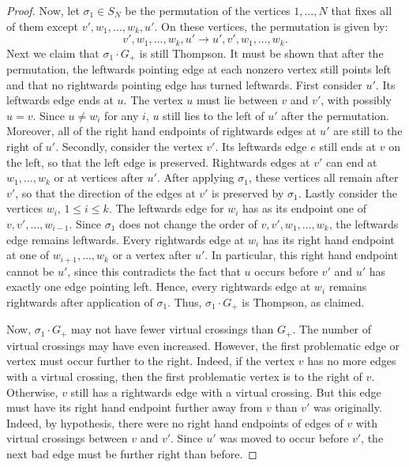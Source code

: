 \documentclass[11pt, twoside]{amsart}
\numberwithin{equation}{section}
\theoremstyle{definition}
\numberwithin{equation}{section}
\begin{document}
\begin{proof}
Now, let $\sigma_1 \in S_N$ be the permutation of the vertices $1,\ldots,N$ that fixes all of them except $v',w_1,\ldots, w_k,u'$. On these vertices, the permutation is given by:
\[
v',w_1,\ldots, w_k,u' \to u',v',w_1,\ldots, w_k.
\]
Next we claim that $\sigma_1\cdot G_+$ is still Thompson. It must be shown that after the permutation, the leftwards pointing edge at each nonzero vertex still points left and that no rightwards pointing edge has turned leftwards. First consider $u'$. Its leftwards edge ends at $u$. The vertex $u$ must lie between $v$ and $v'$, with possibly $u=v$. Since $u \ne w_i$ for any $i$, $u$ still lies to the left of $u'$ after the permutation. Moreover, all of the right hand endpoints of rightwards edges at $u'$ are still to the right of $u'$. Secondly, consider the vertex $v'$.  Its leftwards edge $e$ still ends at $v$ on the left, so that the left edge is preserved. Rightwards edges at $v'$ can end at $w_1,\ldots,w_k$ or at vertices after $u'$. After applying $\sigma_1$, these vertices all remain after $v'$, so that the direction of the edges at $v'$ is preserved by $\sigma_1$. Lastly consider the vertices $w_i$, $1 \le i \le k$. The leftwards edge for $w_i$ has as its endpoint one of $v,v',\ldots, w_{i-1}$. Since $\sigma_1$ does not change the order of $v,v',w_1,\ldots,w_k$, the leftwards edge remains leftwards. Every rightwards edge at $w_i$ has its right hand endpoint at one of $w_{i+1},\ldots, w_k$ or a vertex after $u'$. In particular, this right hand endpoint cannot be $u'$, since this contradicts the fact that $u$ occurs before $v'$ and $u'$ has exactly one edge pointing left. Hence, every rightwards edge at $w_i$ remains rightwards after application of $\sigma_1$. Thus, $\sigma_1 \cdot G_+$ is Thompson, as claimed.  

Now, $\sigma_1 \cdot G_+$ may not have fewer virtual crossings than $G_+$. The number of virtual crossings may have even increased. However, the first problematic edge or vertex must occur further to the right. Indeed, if the vertex $v$ has no more edges with a virtual crossing, then the first problematic vertex is to the right of $v$. Otherwise, $v$ still has a rightwards edge with a virtual crossing. But this edge must have its right hand endpoint further away from $v$ than $v'$ was originally. Indeed, by hypothesis, there were no right hand endpoints of edges of $v$ with virtual crossings between $v$ and $v'$. Since $u'$ was moved to occur before $v'$, the next bad edge must be further right than before. 


\end{proof}
\end{document}
